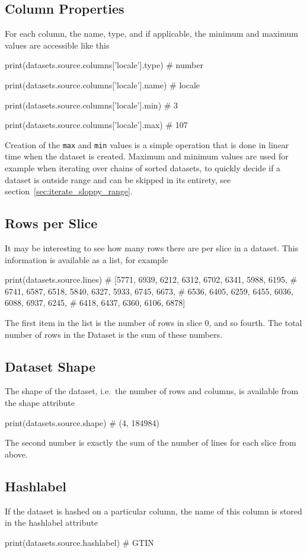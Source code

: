 \subsection*{Column Properties}
For each column, the name, type, and if applicable, the minimum and
maximum values are accessible like this
\begin{python}
print(datasets.source.columns['locale'].type)
# number

print(datasets.source.columns['locale'].name)
# locale

print(datasets.source.columns['locale'].min)
# 3

print(datasets.source.columns['locale'].max)
# 107
\end{python}
Creation of the \texttt{max} and \texttt{min} values is a simple
operation that is done in linear time when the dataset is created.
Maximum and minimum values are used for example when iterating over
chains of sorted datasets, to quickly decide if a dataset is outside
range and can be skipped in its entirety, see
section~\ref{sec:iterate_sloppy_range}.


\subsection*{Rows per Slice}

It may be interesting to see how many rows there are per slice in a
dataset.  This information is available as a list, for example
\begin{python}
print(datasets.source.lines)
# [5771, 6939, 6212, 6312, 6702, 6341, 5988, 6195,
#  6741, 6587, 6518, 5840, 6327, 5933, 6745, 6673,
#  6536, 6405, 6259, 6455, 6036, 6088, 6937, 6245,
#  6418, 6437, 6360, 6106, 6878]
\end{python}
The first item in the list is the number of rows in slice 0, and so
fourth.  The total number of rows in the Dataset is the sum of these
numbers.


\subsection*{Dataset Shape}
The shape of the dataset, i.e.\ the number of rows and columns, is
available from the shape attribute
\begin{python}
print(datasets.source.shape)
# (4, 184984)
\end{python}
The second number is exactly the sum of the number of lines for each
slice from above.


\subsection*{Hashlabel}
If the dataset is hashed on a particular column, the name of this
column is stored in the hashlabel attribute
\begin{python}
print(datasets.source.hashlabel)
# GTIN
\end{python}




